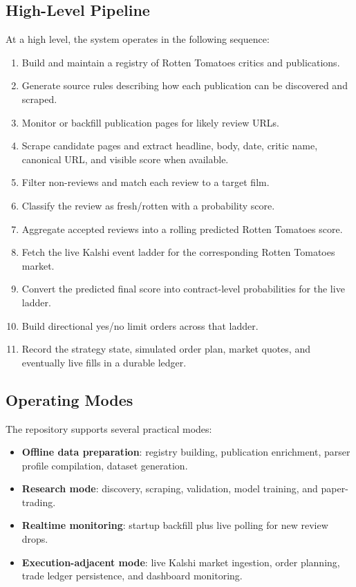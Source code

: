 \documentclass[11pt]{article}
\begin{document}
\subsection{High-Level Pipeline}
At a high level, the system operates in the following sequence:
\begin{enumerate}[leftmargin=1.5em]
    \item Build and maintain a registry of Rotten Tomatoes critics and publications.
    \item Generate source rules describing how each publication can be discovered and scraped.
    \item Monitor or backfill publication pages for likely review URLs.
    \item Scrape candidate pages and extract headline, body, date, critic name, canonical URL, and visible score when available.
    \item Filter non-reviews and match each review to a target film.
    \item Classify the review as fresh/rotten with a probability score.
    \item Aggregate accepted reviews into a rolling predicted Rotten Tomatoes score.
    \item Fetch the live Kalshi event ladder for the corresponding Rotten Tomatoes market.
    \item Convert the predicted final score into contract-level probabilities for the live ladder.
    \item Build directional yes/no limit orders across that ladder.
    \item Record the strategy state, simulated order plan, market quotes, and eventually live fills in a durable ledger.
\end{enumerate}

\subsection{Operating Modes}
The repository supports several practical modes:
\begin{itemize}[leftmargin=1.5em]
    \item \textbf{Offline data preparation}: registry building, publication enrichment, parser profile compilation, dataset generation.
    \item \textbf{Research mode}: discovery, scraping, validation, model training, and paper-trading.
    \item \textbf{Realtime monitoring}: startup backfill plus live polling for new review drops.
    \item \textbf{Execution-adjacent mode}: live Kalshi market ingestion, order planning, trade ledger persistence, and dashboard monitoring.
\end{itemize}
\end{document}
